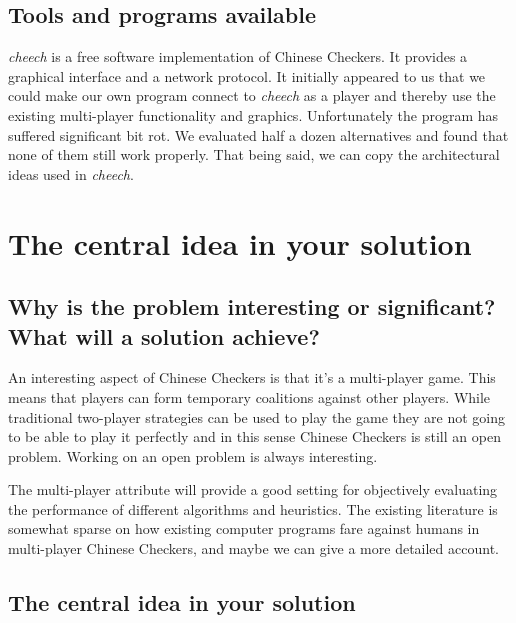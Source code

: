 \documentclass[a4paper,11pt]{article}
\begin{document}
\subsection{Tools and programs available}
\emph{cheech} is a free software implementation of Chinese Checkers.
It provides a graphical interface and a network protocol. It initially
appeared to us that we could make our own program connect to
\emph{cheech} as a player and thereby use the existing multi-player
functionality and graphics. Unfortunately the program has suffered
significant bit rot. We evaluated half a dozen alternatives and found
that none of them still work properly. That being said, we can copy
the architectural ideas used in \emph{cheech}.

\section{The central idea in your solution}
\subsection{Why is the problem interesting or significant?  What will a solution achieve?}

An interesting aspect of Chinese Checkers is that it's a multi-player
game. This means that players can form temporary coalitions against
other players. While traditional two-player strategies can be used to
play the game they are not going to be able to play it perfectly and
in this sense Chinese Checkers is still an open problem. Working on an
open problem is always interesting.

The multi-player attribute will provide a good setting for objectively
evaluating the performance of different algorithms and heuristics. The
existing literature is somewhat sparse on how existing computer
programs fare against humans in multi-player Chinese Checkers, and
maybe we can give a more detailed account.

\subsection{The central idea in your solution}
\end{document}
